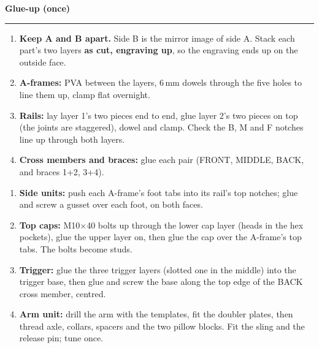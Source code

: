 \documentclass[11pt,a4paper]{article}
\newcommand{\sechead}[1]{%
  \par\vspace{5pt}%
  {\bfseries\large\color{HeadGrey} #1}\\[-4pt]
  {\color{RuleGrey}\rule{\linewidth}{0.8pt}}\par\vspace{1pt}}
\begin{document}
\sechead{Glue-up (once)}
\begin{minipage}[t]{0.49\linewidth}
\begin{enumerate}[itemsep=1pt, leftmargin=1.5em, topsep=1pt]
  \item \textbf{Keep A and B apart.} Side B is the mirror image of side A. Stack each part's two layers \textbf{as cut, engraving up}, so the engraving ends up on the outside face.
  \item \textbf{A-frames:} PVA between the layers, 6\,mm dowels through the five holes to line them up, clamp flat overnight.
  \item \textbf{Rails:} lay layer 1's two pieces end to end, glue layer 2's two pieces on top (the joints are staggered), dowel and clamp. Check the B, M and F notches line up through both layers.
  \item \textbf{Cross members and braces:} glue each pair (FRONT, MIDDLE, BACK, and braces 1+2, 3+4).
\end{enumerate}
\end{minipage}\hfill
\begin{minipage}[t]{0.49\linewidth}
\begin{enumerate}[itemsep=1pt, leftmargin=1.5em, topsep=1pt, start=5]
  \item \textbf{Side units:} push each A-frame's foot tabs into its rail's top notches; glue and screw a gusset over each foot, on both faces.
  \item \textbf{Top caps:} M10$\times$40 bolts up through the lower cap layer (heads in the hex pockets), glue the upper layer on, then glue the cap over the A-frame's top tabs. The bolts become studs.
  \item \textbf{Trigger:} glue the three trigger layers (slotted one in the middle) into the trigger base, then glue and screw the base along the top edge of the BACK cross member, centred.
  \item \textbf{Arm unit:} drill the arm with the templates, fit the doubler plates, then thread axle, collars, spacers and the two pillow blocks. Fit the sling and the release pin; tune once.
\end{enumerate}
\end{minipage}
\end{document}
